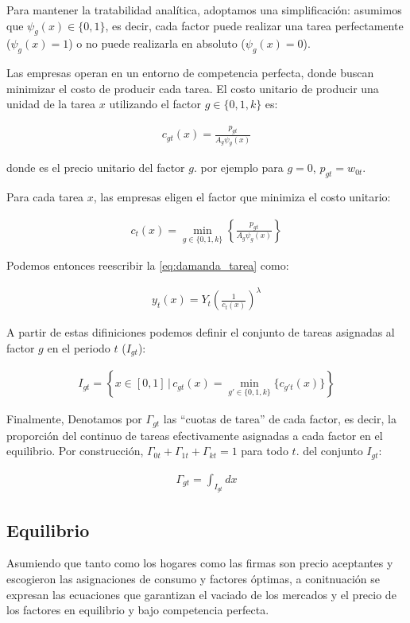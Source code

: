 \documentclass{article}
\theoremstyle{remark}
\theoremstyle{definition}
\begin{document}
Para mantener la tratabilidad analítica, adoptamos una simplificación: asumimos que $\psi_g(x) \in \{0, 1\}$, es decir, cada factor puede realizar una tarea perfectamente ($\psi_g(x) = 1$) o no puede realizarla en absoluto ($\psi_g(x) = 0$).

Las empresas operan en un entorno de competencia perfecta, donde buscan minimizar el costo de producir cada tarea. El costo unitario de producir una unidad de la tarea $x$ utilizando el factor $g \in \{0, 1, k\}$ es:

\begin{align*}
    c_{gt}(x) = \frac{p_{gt}}{A_g \psi_g(x)}
    \label{eq:costo_unitario_tarea}
\end{align*}

donde es el precio unitario del factor $g$. por ejemplo para $g=0$, $p_{gt}=w_{0t}$.

Para cada tarea $x$, las empresas eligen el factor que minimiza el costo unitario:

\begin{align*}
    c_t(x) = \min_{g \in \{0, 1, k\}} \left\{ \frac{p_{gt}}{A_g \psi_g(x)} \right\}
\end{align*}

Podemos entonces reescribir la \ref{eq:damanda_tarea} como:

\begin{align*}
    \tag{Demanda Tarea x}
    y_t(x)  = Y_t \left( \frac{1}{c_t(x)} \right)^{\lambda}
    \label{eq:damanda_tarea}
\end{align*}

A partir de estas difiniciones podemos definir el conjunto de tareas asignadas al factor $g$ en el periodo $t$ ($I_{gt}$):

\begin{align*}
    I_{gt} = \left\{ x \in [0,1] \, | \, c_{gt}(x) = \min_{g' \in \{0, 1, k\}} \{c_{g't}(x)\} \right\}
\end{align*}

Finalmente, Denotamos por $\Gamma_{gt}$ las ``cuotas de tarea'' de cada factor, es decir, la proporción del continuo de tareas efectivamente asignadas a cada factor en el equilibrio. Por construcción, $\Gamma_{0t} + \Gamma_{1t} + \Gamma_{kt} = 1$ para todo $t$. del conjunto $I_{gt}$:

\begin{align*}
    \Gamma_{gt} = \int_{I_{gt}} dx
\end{align*}

\subsection{Equilibrio}
Asumiendo que tanto como los hogares como las firmas son precio aceptantes y escogieron las asignaciones de consumo y factores \'optimas, a conitnuaci\'on se expresan las ecuaciones que garantizan el vaciado de los mercados y el precio de los factores en equilibrio y bajo competencia perfecta.
\end{document}
